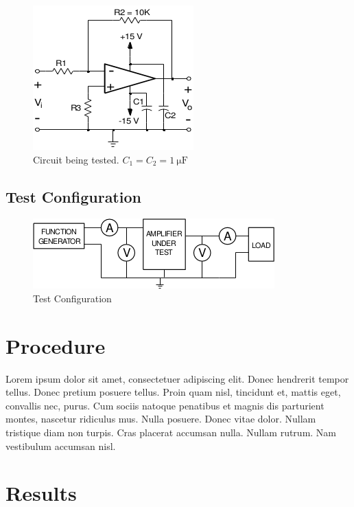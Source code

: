 \documentclass{article}
\begin{document}
\begin{figure}[h]
  \label{fig:circuit}
  \centering
    \includegraphics[]{img/circuit}
  \caption{Circuit being tested.  $C_1 = C_2 = \SI{1}{\micro\farad}$}
\end{figure}

\subsection*{Test Configuration}
\label{sec:test_config}

\begin{figure}[h]
  \centering
  \includegraphics[]{img/test_config}
  \caption{Test Configuration}
  \label{fig:test_config}
\end{figure}

\section{Procedure}
\label{sec:procedure}

Lorem ipsum dolor sit amet, consectetuer adipiscing elit. Donec
hendrerit tempor tellus. Donec pretium posuere tellus. Proin quam
nisl, tincidunt et, mattis eget, convallis nec, purus. Cum sociis
natoque penatibus et magnis dis parturient montes, nascetur ridiculus
mus. Nulla posuere. Donec vitae dolor. Nullam tristique diam non
turpis. Cras placerat accumsan nulla. Nullam rutrum. Nam vestibulum
accumsan nisl.

\section{Results}
\end{document}
